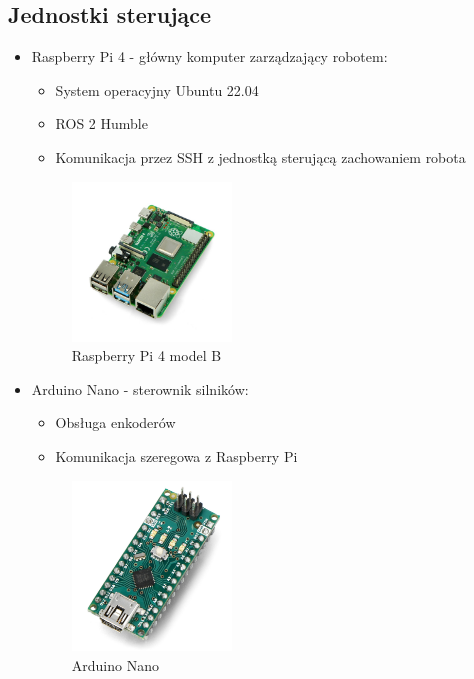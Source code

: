 \documentclass[a4paper,twoside,12pt]{book}
\begin{document}
\subsection{Jednostki sterujące}
\begin{itemize}
\item Raspberry Pi 4 - główny komputer zarządzający robotem:
	\begin{itemize}
	\item System operacyjny Ubuntu 22.04
	\item ROS 2 Humble
	\item Komunikacja przez SSH z jednostką sterującą zachowaniem robota
	\end{itemize}
	\begin{figure}[!hb]
		\centering
		\includegraphics[width=0.4\textwidth]{images/rasp.png}
		\caption{Raspberry Pi 4 model B}
		\label{fig:raspberrypi4}
		\end{figure}
		\newpage	
		
\item Arduino Nano - sterownik silników:
	\begin{itemize}
	\item Obsługa enkoderów
	\item Komunikacja szeregowa z Raspberry Pi
	\end{itemize}

	\begin{figure}[!hb]
		\centering
		\includegraphics[width=0.4\textwidth]{images/nano.png}
		\caption{Arduino Nano}
		\label{fig:ardunano}
		\end{figure}
\end{itemize}
\end{document}
